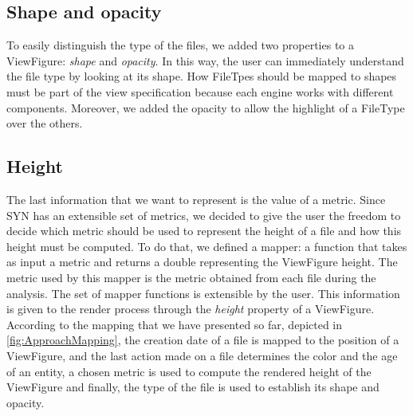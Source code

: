 \subsection*{Shape and opacity}
To easily distinguish the type of the files, we added two properties to a ViewFigure: \textit{shape} and \textit{opacity}. 
In this way, the user can immediately understand the file type by looking at its shape. How FileTpes should be mapped to shapes must be part of the view specification because each engine works with different components. 
\bigbreak
Moreover, we added the opacity to allow the highlight of a FileType over the others. 

\subsection*{Height}
The last information that we want to represent is the value of a metric. Since SYN has an extensible set of metrics, we decided to give the user the freedom to decide which metric should be used to represent the height of a file and how this height must be computed. 
To do that, we defined a mapper: a function that takes as input a metric and returns a double representing the ViewFigure height. The metric used by this mapper is the metric obtained from each file during the analysis. The set of mapper functions is extensible by the user. \bigbreak
This information is given to the render process through the \textit{height} property of a ViewFigure.
\bigbreak
According to the mapping that we have presented so far, depicted in \autoref{fig:ApproachMapping}, the creation date of a file is mapped to the position of a ViewFigure, and the last action made on a file determines the color and the age of an entity, a chosen metric is used to compute the rendered height of the ViewFigure and finally, the type of the file is used to establish its shape and opacity. 



